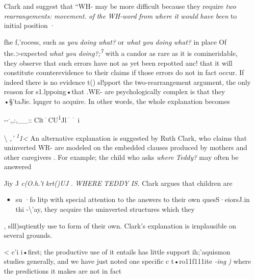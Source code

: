 Clark and \citet[354]{Clark1977} suggest that ``WH- may be more difficult because they require \textit{two} \textit{rearrangements:} \textit{movement.} \textit{of} \textit{the} \textit{WH-word} \textit{from} \textit{where} \textit{it} \textit{would} \textit{have} \textit{been} to initial position ·

fhe f,'rocess, such as \textit{you} \textit{doing} \textit{what?} or \textit{what} \textit{you} \textit{doi}\textit{n}\textit{g} \textit{what?} in place Of the.{\textgreater}expected \textit{what} \textit{you doing?;}\textit{\textsuperscript{7 }}with a candor as rare as it is comineridable, they observe that such errors have not as yet been repotted anc! that it will constitute counterevidence to their claims if those errors do not in fact occur. If indeed there is no evidence
t() sl!pport the two-rearrangement argument, the only reason for s1.lppoing•that .WE- are psychologically complex is that they 
•§'taJie. lqnger to acquire. In other words, the whole explanation becomes

{}-{}-\textsuperscript{.},,:,\_\_:: \textsuperscript{{\textquotedbl}}C\textsuperscript{{\textquotedbl}}lt\textsuperscript{·}CU\textsuperscript{1}Jl\textsuperscript{·}\textsuperscript{·} i

{\textbackslash} \textit{,'} \textit{\textsuperscript{1}}\textit{1{\textless}} An alternative explanation is suggested by Ruth Clark, who
claims that uninverted WR- are modeled on the embedded
clauses produced by mothers and other caregivers \citep{Clark1977}.
For example; the child who asks \textit{where} \textit{Teddy?} may often be answered

Jiy J \textit{c(O.}\textit{h.'t} \textit{krt()UJ} \textit{.} \textit{WHERE} \textit{TEDDY} \textit{IS.} Clark argues that children are

\begin{itemize}
\item su ·fo litp with special attention to the answers to their own ques\-S·eiorsJ.in thi -{\textbackslash}'ay, they acquire the uninverted structures which they
\end{itemize}

, slll)sqtiently use to form  of their own. Clark's explanation is irnplausible on several grounds.

{\textless} c'i i•first; the productive use of  it entails has little support ih;'aquismon studies generally, and we have just noted one specific c t•ro11f111ite \textit{{}-i}\textit{n}\textit{g{\textquotedbl}} \textit{)} where the predictions it makes are not in fact

